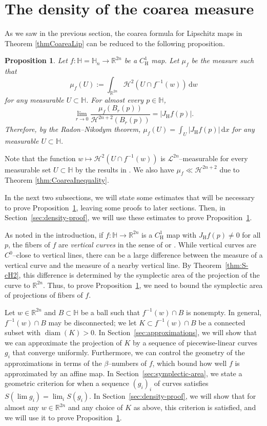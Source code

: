 \documentclass[12pt,reqno]{amsart}
\newcommand{\cH}{\mathcal{H}}
\newcommand{\cL}{\mathcal{L}}
\newcommand{\JfH}{J_\mathrm{H}f}
\newcommand{\HH}{\mathbb{H}}
\newcommand{\R}{\mathbb{R}}
\newcommand{\ud}[0]{\,\mathrm{d}}
\newcommand{\from}{\colon}
\newtheorem{prop}[thm]{Proposition}
\theoremstyle{remark}
\newcommand{\0}{\mathbf{0}}
\renewcommand{\1}{\mathbf 1}
\DeclareMathOperator{\diam}{diam}
\begin{document}
\section{The density of the coarea measure}\label{sec:CoAreaC1H}

As we saw in the previous section, the coarea formula for Lipschitz maps in Theorem \ref{thmCoareaLip} can be reduced to the following proposition.
\begin{prop}\label{prop:density}
  Let $f\from \HH = \HH_n\to \R^{2n}$ be a $C^1_{\mathrm{H}}$ map. Let $\mu_f$ be the measure such that
  $$
  \mu_f(U) := \int_{\R^{2n}} \cH^2(U\cap f^{-1}(w))\ud w
  $$
  for any measurable $U\subset \HH$.
  For almost every $p\in \HH$,
  $$\lim_{r\to 0} \frac{\mu_f(B_r(p))}{\cH^{2n+2}(B_r(p))} = |\JfH(p)|.$$
  Therefore, by the Radon--Nikodym theorem, $\mu_f(U) = \int_U |\JfH(p)|\ud x$ for any measurable $U\subset \HH$.
\end{prop}
Note that the function $w\mapsto \cH^2(U\cap f^{-1}(w))$ is $\cL^{2n}$--measurable for every measurable set $U\subset \HH$ by the results in \cite[¶2.10.26]{FedererBook}. We also have $\mu_f\ll \cH^{2n+2}$ due to Theorem \ref{thm:CoareaInequality}.

In the next two subsections, we will state some estimates that will be necessary to prove Proposition~\ref{prop:density}, leaving some proofs to later sections. Then, in Section~\ref{sec:density-proof}, we will use these estimates to prove Proposition~\ref{prop:density}.

As noted in the introduction, if $f\from \HH\to \R^{2n}$ is a $C^1_{\mathrm{H}}$ map with $\JfH(p)\ne 0$ for all $p$, the fibers of $f$ are \emph{vertical curves} in the sense of \cite{Kozhevnikov} or \cite{AY-Vertical}. While vertical curves are $C^0$--close to vertical lines, there can be a large difference between the measure of a vertical curve and the measure of a nearby vertical line. By Theorem~\ref{thm:S-cH2}, this difference is determined by the symplectic area of the projection of the curve to $\R^{2n}$. Thus, to prove Proposition~\ref{prop:density}, we need to bound the symplectic area of projections of fibers of $f$.

Let $w\in \mathbb R^{2n}$ and $B\subset \HH$ be a ball such that $f^{-1}(w)\cap B$ is nonempty. In general, $f^{-1}(w)\cap B$ may be disconnected; we let $K\subset f^{-1}(w)\cap B$ be a connected subset with $\diam(K)>0$. In Section~\ref{sec:approximations}, we will show that we can approximate the projection of $K$ by a sequence of piecewise-linear curves $g_i$ that converge uniformly. Furthermore, we can control the geometry of the approximations in terms of the $\beta$--numbers of $f$, which bound how well $f$ is approximated by an affine map. In Section~\ref{sec:symplectic-area}, we state a geometric criterion for when a sequence $(g_i)_i$ of curves satisfies $S(\lim g_i) = \lim_i S(g_i)$. In Section~\ref{sec:density-proof}, we will show that for almost any $w\in \R^{2n}$ and any choice of $K$ as above, this criterion is satisfied, and we will use it to prove Proposition~\ref{prop:density}.
\end{document}
